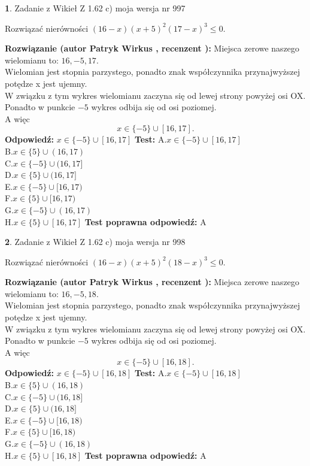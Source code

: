 \documentclass[12pt, a4paper]{article}
\theoremstyle{definition} %
\newtheorem{zad}{}
\newcommand{\zadStart}[1]{\begin{zad}#1\newline}
\newcommand{\zadStop}{\end{zad}}
\newcommand{\rozwStart}[2]{\noindent \textbf{Rozwiązanie (autor #1 , recenzent #2): }\newline}
\newcommand{\rozwStop}{\newline}
\newcommand{\odpStart}{\noindent \textbf{Odpowiedź:}\newline}
\newcommand{\odpStop}{\newline}
\newcommand{\testStart}{\noindent \textbf{Test:}\newline}
\newcommand{\testStop}{\newline}
\newcommand{\kluczStart}{\noindent \textbf{Test poprawna odpowiedź:}\newline}
\newcommand{\kluczStop}{\newline}
\begin{document}
\zadStart{Zadanie z Wikieł Z 1.62 c) moja wersja nr 997}

Rozwiązać nierówności $(16-x)(x+5)^{2}(17-x)^{3}\le0$.
\zadStop
\rozwStart{Patryk Wirkus}{}
Miejsca zerowe naszego wielomianu to: $16, -5, 17$.\\
Wielomian jest stopnia parzystego, ponadto znak współczynnika przy\linebreak najwyższej potędze x jest ujemny.\\ W związku z tym wykres wielomianu zaczyna się od lewej strony powyżej osi OX.\\
Ponadto w punkcie $-5$ wykres odbija się od osi poziomej.\\
A więc $$x \in \{-5\} \cup [16,17].$$
\rozwStop
\odpStart
$x \in \{-5\} \cup [16,17]$
\odpStop
\testStart
A.$x \in \{-5\} \cup [16,17]$\\
B.$x \in \{5\} \cup (16,17)$\\
C.$x \in \{-5\} \cup (16,17]$\\
D.$x \in \{5\} \cup (16,17]$\\
E.$x \in \{-5\} \cup [16,17)$\\
F.$x \in \{5\} \cup [16,17)$\\
G.$x \in \{-5\} \cup (16,17)$\\
H.$x \in \{5\} \cup [16,17]$
\testStop
\kluczStart
A
\kluczStop



\zadStart{Zadanie z Wikieł Z 1.62 c) moja wersja nr 998}

Rozwiązać nierówności $(16-x)(x+5)^{2}(18-x)^{3}\le0$.
\zadStop
\rozwStart{Patryk Wirkus}{}
Miejsca zerowe naszego wielomianu to: $16, -5, 18$.\\
Wielomian jest stopnia parzystego, ponadto znak współczynnika przy\linebreak najwyższej potędze x jest ujemny.\\ W związku z tym wykres wielomianu zaczyna się od lewej strony powyżej osi OX.\\
Ponadto w punkcie $-5$ wykres odbija się od osi poziomej.\\
A więc $$x \in \{-5\} \cup [16,18].$$
\rozwStop
\odpStart
$x \in \{-5\} \cup [16,18]$
\odpStop
\testStart
A.$x \in \{-5\} \cup [16,18]$\\
B.$x \in \{5\} \cup (16,18)$\\
C.$x \in \{-5\} \cup (16,18]$\\
D.$x \in \{5\} \cup (16,18]$\\
E.$x \in \{-5\} \cup [16,18)$\\
F.$x \in \{5\} \cup [16,18)$\\
G.$x \in \{-5\} \cup (16,18)$\\
H.$x \in \{5\} \cup [16,18]$
\testStop
\kluczStart
A
\kluczStop
\end{document}
